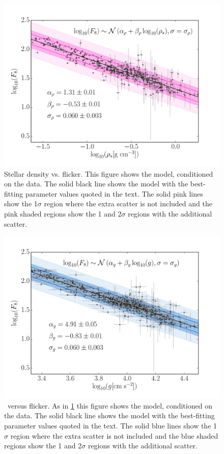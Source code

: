 \begin{figure}
\begin{center}
\includegraphics[width=6in,angle=0,clip=true]{figures/flicker_vs_rho.pdf}
\caption[Stellar density versus flicker.]{
Stellar density vs. flicker.
This figure shows the model, conditioned on the data.
The solid black line shows the model with the best-fitting parameter values
quoted in the text.
The solid pink lines show the 1$\sigma$ region where the extra scatter is not
included and the pink shaded regions show the 1 and 2$\sigma$ regions with the
additional scatter.}
\label{fig:rhostar}
\end{center}
\end{figure}

\begin{figure}
\begin{center}
\includegraphics[width=6in,angle=0,clip=true]{figures/flicker_vs_logg.pdf}
\caption[\logg\ versus flicker.]{
\logg\ versus flicker.
As in \ref{fig:rhostar} this figure shows the model, conditioned on the data.
The solid black line shows the model with the best-fitting parameter values
quoted in the text.
The solid blue lines show the 1$\sigma$ region where the extra scatter is not
included and the blue shaded regions show the 1 and 2$\sigma$ regions with the
additional scatter.}
\label{fig:logg}
\end{center}
\end{figure}

